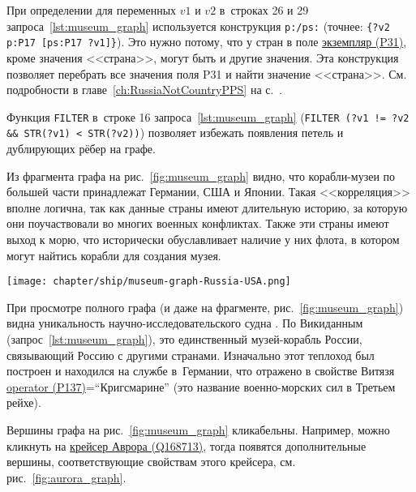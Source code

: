 \newpage
    При определении  для переменных $v1$ и $v2$ 
    в~строках 26 и 29 запроса~\ref{lst:museum_graph} 
    используется конструкция \texttt{p:/ps:} (точнее: \texttt{\{?v2 p:P17 [ps:P17 ?v1]\}}). 
    Это нужно потому, что у стран в поле 
    \href{https://www.wikidata.org/wiki/Property:P31}{экземпляр (P31)}, 
    кроме значения <<страна>>, могут быть и другие значения. 
    Эта конструкция позволяет перебрать все значения поля P31 и найти значение <<страна>>.
    См. подробности в главе~\ref{ch:RussiaNotCountryPPS} на с.~\pageref{ch:RussiaNotCountryPPS}.

    Функция \lstinline|FILTER|
    в~строке 16 запроса~\ref{lst:museum_graph} 
    \mbox{(\lstinline|FILTER (?v1 != ?v2 && STR(?v1) < STR(?v2))|)} 
    позволяет избежать появления петель и дублирующих рёбер на графе.

Из фрагмента графа на рис.~\ref{fig:museum_graph} видно, 
что корабли-музеи по большей части принадлежат Германии, США и Японии. 
Такая <<корреляция>> вполне логична, так как данные страны имеют длительную историю, 
за которую они поучаствовали во многих военных конфликтах. 
Также эти страны имеют выход к морю, что исторически обуславливает наличие у них флота, 
в котором могут найтись корабли для создания музея.

\begin{figure*}[h!]
  \texttt{[image: chapter/ship/museum-graph-Russia-USA.png]}
  \caption[Граф стран и кораблей-музеев, 2021 год.]{Фрагмент графа стран, участвовавших в войнах, включает ряд кораблей-музеев России и США}%
  \label{fig:museum_graph}%
\end{figure*}

При просмотре полного графа (и даже на фрагменте, рис.~\ref{fig:museum_graph}) 
видна уникальность научно-исследовательского судна . 
По Викиданным (запрос~\ref{lst:museum_graph}), 
это единственный музей-корабль России, связывающий Россию с другими странами. 
Изначально этот теплоход был построен и находился на службе в~Германии, 
что отражено в свойстве Витязя 
\href{https://www.wikidata.org/wiki/Property:P137}{operator (P137)}=``Кригсма\-рине'' 
(это название военно-морских сил в Третьем рейхе).

Вершины графа на рис.~\ref{fig:museum_graph} кликабельны. 
Например, можно кликнуть на \href{https://www.wikidata.org/wiki/Q168713}{крейсер Аврора (Q168713)}, 
тогда появятся дополнительные вершины, соответствующие свойствам этого крейсера, см. рис.~\ref{fig:aurora_graph}.

